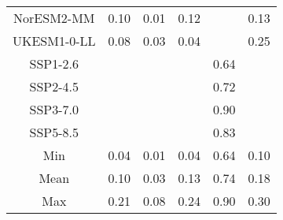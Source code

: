 \begin{table*}[t]
\begin{tabular}{c|rrr|rr}
NorESM2-MM & 0.10 & 0.01 & 0.12 &  & 0.13 \\
UKESM1-0-LL & 0.08 & 0.03 & 0.04 &  & 0.25 \\
SSP1-2.6 &  &  &  & 0.64 &  \\
SSP2-4.5 &  &  &  & 0.72 &  \\
SSP3-7.0 &  &  &  & 0.90 &  \\
SSP5-8.5 &  &  &  & 0.83 &  \\
\midrule
Min & 0.04 & 0.01 & 0.04 & 0.64 & 0.10 \\
Mean & 0.10 & 0.03 & 0.13 & 0.74 & 0.18 \\
Max & 0.21 & 0.08 & 0.24 & 0.90 & 0.30 \\
\bottomrule
\end{tabular}
\end{table*}
